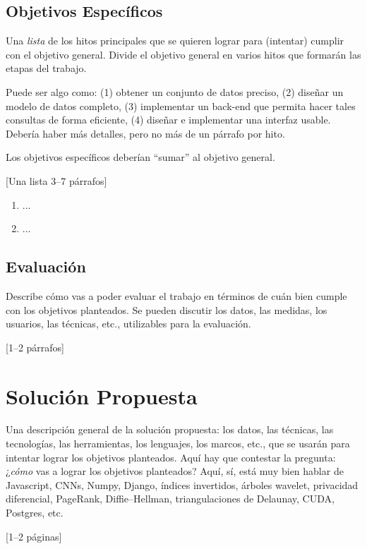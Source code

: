 \documentclass[guia]{upropuesta}
\begin{document}
  \subsection*{Objetivos Específicos}\label{sec:obj-e}
  
  \begin{pauta}
  Una \textit{lista} de los hitos principales que se quieren lograr para (intentar) cumplir con el objetivo general. Divide el objetivo general en varios hitos que formarán las etapas del trabajo.
  
  Puede ser algo como: (1) obtener un conjunto de datos preciso, (2) diseñar un modelo de datos completo, (3) implementar un back-end que permita hacer tales consultas de forma eficiente, (4) diseñar e implementar una interfaz usable. Debería haber más detalles, pero no más de un párrafo por hito. 
  
  Los objetivos específicos deberían ``sumar'' al objetivo general.
  
  [Una lista 3--7 párrafos]
  \end{pauta}
  
  \begin{enumerate}
    \item ...
    \item ...
  \end{enumerate}
  
  \subsection*{Evaluación}\label{sec:eval}
  
  \begin{pauta}
  Describe cómo vas a poder evaluar el trabajo en términos de cuán bien  cumple con los objetivos planteados. Se pueden discutir los datos, las medidas, los usuarios, las técnicas, etc., utilizables para la evaluación.
  
  [1--2 párrafos]
  \end{pauta}

\section{Solución Propuesta}\label{sec:sol}

\begin{pauta}
Una descripción general de la solución propuesta: los datos, las técnicas, las tecnologías, las herramientas, los lenguajes, los marcos, etc., que se usarán para intentar lograr los objetivos planteados. Aquí hay que contestar la pregunta: ¿\textit{cómo} vas a lograr los objetivos planteados? Aquí, sí, está muy bien hablar de Javascript, CNNs, Numpy, Django, índices invertidos, árboles wavelet, privacidad diferencial, PageRank, Diffie--Hellman, triangulaciones de Delaunay, CUDA, Postgres, etc.

[1--2 páginas]
\end{pauta}
\end{document}
